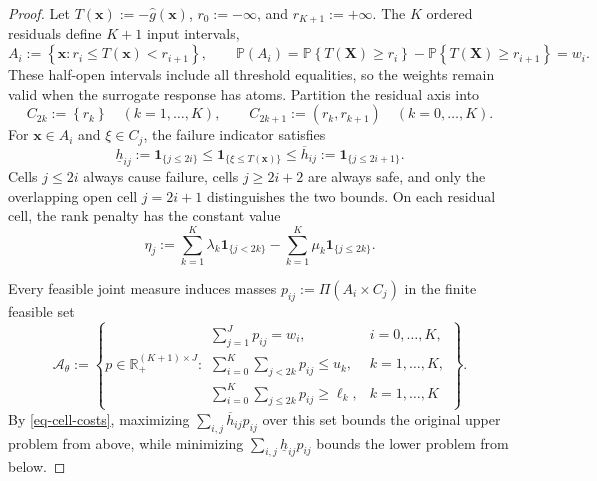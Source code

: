 \begin{proof}
  Let $T(\bm x):=-\hat g(\bm x)$, $r_0:=-\infty$, and $r_{K+1}:=+\infty$. The $K$ ordered residuals define $K+1$ input intervals,
  \begin{equation}
    A_i:=\left\{\bm x:r_i\le T(\bm x)<r_{i+1}\right\},\qquad
    \mathbb P\left(A_i\right)
    =\mathbb P\left\{T(\bm X)\ge r_i\right\}
    -\mathbb P\left\{T(\bm X)\ge r_{i+1}\right\}=w_i.
    \label{eq-input-cells}
  \end{equation}
  These half-open intervals include all threshold equalities, so the weights remain valid when the surrogate response has atoms. Partition the residual axis into
  \begin{equation}
    C_{2k}:=\left\{r_k\right\}\quad(k=1,\ldots,K),\qquad
    C_{2k+1}:=\left(r_k,r_{k+1}\right)\quad(k=0,\ldots,K).
    \label{eq-residual-cells}
  \end{equation}
  For $\bm x\in A_i$ and $\xi\in C_j$, the failure indicator satisfies
  \begin{equation}
    \underline h_{ij}:=\mathbf1_{\{j\le2i\}}
    \le\mathbf1_{\{\xi\le T(\bm x)\}}
    \le\overline h_{ij}:=\mathbf1_{\{j\le2i+1\}}.
    \label{eq-cell-costs}
  \end{equation}
  Cells $j\le2i$ always cause failure, cells $j\ge2i+2$ are always safe, and only the overlapping open cell $j=2i+1$ distinguishes the two bounds. On each residual cell, the rank penalty has the constant value
  \begin{equation}
    \eta_j:=\sum_{k=1}^K\lambda_k\mathbf1_{\{j<2k\}}
    -\sum_{k=1}^K\mu_k\mathbf1_{\{j\le2k\}}.
    \label{eq-dual-cell-values}
  \end{equation}

  Every feasible joint measure induces masses $p_{ij}:=\Pi(A_i\times C_j)$ in the finite feasible set
  \begin{equation}
    \mathcal A_\theta:=\left\{p\in\mathbb R_+^{(K+1)\times J}:
    \begin{array}{ll}
      \displaystyle\sum_{j=1}^Jp_{ij}=w_i,&i=0,\ldots,K,\\[1mm]
      \displaystyle\sum_{i=0}^K\sum_{j<2k}p_{ij}\le u_k,&k=1,\ldots,K,\\[1mm]
      \displaystyle\sum_{i=0}^K\sum_{j\le2k}p_{ij}\ge\ell_k,&k=1,\ldots,K
    \end{array}\right\}.
    \label{eq-cell-mass-polytope}
  \end{equation}
  By \eqref{eq-cell-costs}, maximizing $\sum_{i,j}\overline h_{ij}p_{ij}$ over this set bounds the original upper problem from above, while minimizing $\sum_{i,j}\underline h_{ij}p_{ij}$ bounds the lower problem from below.


\end{proof}
